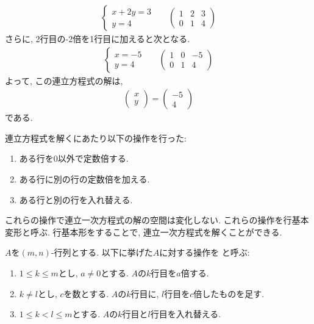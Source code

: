 \begin{align*}
  \begin{cases}
    x+2y=3\\
     y=4
  \end{cases}&&
  \begin{pmatrix}
    1&2&3\\    
    0&1&4
  \end{pmatrix}
\end{align*}
さらに,
2行目の-2倍を1行目に加えると次となる.
\begin{align*}
  \begin{cases}
    x=-5\\
     y=4
  \end{cases}&&
  \begin{pmatrix}
    1&0&-5\\    
    0&1&4
  \end{pmatrix}
\end{align*}
よって,
この連立方程式の解は,
\begin{align*}
  \begin{pmatrix}
    x\\y
  \end{pmatrix}  
  =
  \begin{pmatrix}
    -5\\4
  \end{pmatrix}  
\end{align*}
である.

連立方程式を解くにあたり以下の操作を行った:
\begin{enumerate}
  \item ある行を$0$以外で定数倍する.
  \item ある行に別の行の定数倍を加える.
  \item ある行と別の行を入れ替える.
\end{enumerate}
これらの操作で連立一次方程式の解の空間は変化しない.
これらの操作を行基本変形と呼ぶ.
行基本形をすることで, 連立一次方程式を解くことができる.

\begin{definition}
  \label{def:mat:fundtransformation}
  $A$を$(m,n)$-行列とする.
  以下に挙げた$A$に対する操作を
  と呼ぶ:
  \begin{enumerate}
  \item $1\leq k \leq m$とし, $a \neq 0$とする.
    $A$の$k$行目を$a$倍する.
  \item $k\neq l$とし, $c$を数とする.
    $A$の$k$行目に, $l$行目を$c$倍したものを足す.
  \item $1\leq k<l \leq m$とする.
    $A$の$k$行目と$l$行目を入れ替える.
  \end{enumerate}
\end{definition}


